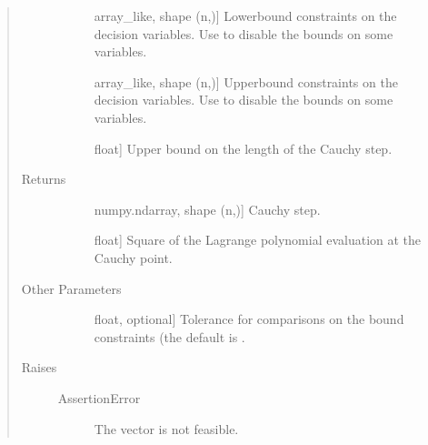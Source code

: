 \documentclass[letterpaper,10pt,english]{sphinxmanual}
\begin{document}
\begin{fulllineitems}
\begin{quote}
\begin{description}
\begin{description}
\item[{}] \leavevmode{[}array\_like, shape (n,){]}
\sphinxAtStartPar
Lower\sphinxhyphen{}bound constraints on the decision variables. Use  to
disable the bounds on some variables.

\item[{}] \leavevmode{[}array\_like, shape (n,){]}
\sphinxAtStartPar
Upper\sphinxhyphen{}bound constraints on the decision variables. Use  to
disable the bounds on some variables.

\item[{}] \leavevmode{[}float{]}
\sphinxAtStartPar
Upper bound on the length of the Cauchy step.

\end{description}

\item[{Returns}] \leavevmode\begin{description}
\item[{}] \leavevmode{[}numpy.ndarray, shape (n,){]}
\sphinxAtStartPar
Cauchy step.

\item[{}] \leavevmode{[}float{]}
\sphinxAtStartPar
Square of the Lagrange polynomial evaluation at the Cauchy point.

\end{description}

\item[{Other Parameters}] \leavevmode\begin{description}
\item[{}] \leavevmode{[}float, optional{]}
\sphinxAtStartPar
Tolerance for comparisons on the bound constraints (the default is
.

\end{description}

\item[{Raises}] \leavevmode\begin{description}
\item[{AssertionError}] \leavevmode
\sphinxAtStartPar
The vector  is not feasible.

\end{description}

\end{description}\end{quote}

\end{fulllineitems}
\end{document}
